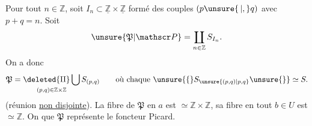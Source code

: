 Pour tout $n\in\mathbb Z$, soit $I_n\subset\underline{\mathbb Z}\times\underline{\mathbb Z}$ formé des couples $(p\unsure{\,|,}q)$ avec $p+q=n$. Soit
\[
\unsure{\mathfrak P|\mathscr P}=\coprod_{n\in\mathbb Z} S_{I_n}.
\]
On a donc
\[
\mathfrak P=\mathop{\deleted{\amalg}\bigcup}_{(p,q)\in\mathbb Z\times\mathbb Z} S_{(p,q)} \qquad\text{où chaque }\unsure{\{}S_{\unsure{(p,q)|p,q}}\unsure{\}}\simeq S.
\]
(réunion \uline{non disjointe}). La fibre de $\mathfrak P$ en $a$ est $\simeq\mathbb Z\times\mathbb Z$, sa fibre en tout $b\in U$ est $\simeq\mathbb Z$. On  que $\mathfrak P$ représente le foncteur Picard.
